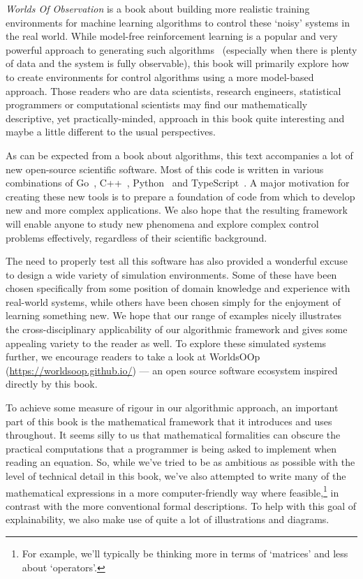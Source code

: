 \documentclass{book}
\begin{document}
\emph{Worlds Of Observation} is a book about building more realistic training environments for machine learning algorithms to control these `noisy' systems in the real world. While model-free reinforcement learning is a popular and very powerful approach to generating such algorithms~\cite{sutton2018reinforcement} (especially when there is plenty of data and the system is fully observable), this book will primarily explore how to create environments for control algorithms using a more model-based approach. Those readers who are data scientists, research engineers, statistical programmers or computational scientists may find our mathematically descriptive, yet practically-minded, approach in this book quite interesting and maybe a little different to the usual perspectives.

As can be expected from a book about algorithms, this text accompanies a lot of new open-source scientific software. Most of this code is written in various combinations of Go~\cite{golang}, C++~\cite{c++lang}, Python~\cite{pythonlang} and TypeScript~\cite{typescriptlang}. A major motivation for creating these new tools is to prepare a foundation of code from which to develop new and more complex applications. We also hope that the resulting framework will enable anyone to study new phenomena and explore complex control problems effectively, regardless of their scientific background.

The need to properly test all this software has also provided a wonderful excuse to design a wide variety of simulation environments. Some of these have been chosen specifically from some position of domain knowledge and experience with real-world systems, while others have been chosen simply for the enjoyment of learning something new. We hope that our range of examples nicely illustrates the cross-disciplinary applicability of our algorithmic framework and gives some appealing variety to the reader as well. To explore these simulated systems further, we encourage readers to take a look at WorldsOOp (\href{https://worldsoop.github.io/}{https://worldsoop.github.io/}) --- an open source software ecosystem inspired directly by this book.

To achieve some measure of rigour in our algorithmic approach, an important part of this book is the mathematical framework that it introduces and uses throughout. It seems silly to us that mathematical formalities can obscure the practical computations that a programmer is being asked to implement when reading an equation. So, while we've tried to be as ambitious as possible with the level of technical detail in this book, we've also attempted to write many of the mathematical expressions in a more computer-friendly way where feasible,\footnote{For example, we'll typically be thinking more in terms of `matrices' and less about `operators'.} in contrast with the more conventional formal descriptions. To help with this goal of explainability, we also make use of quite a lot of illustrations and diagrams.
\end{document}

